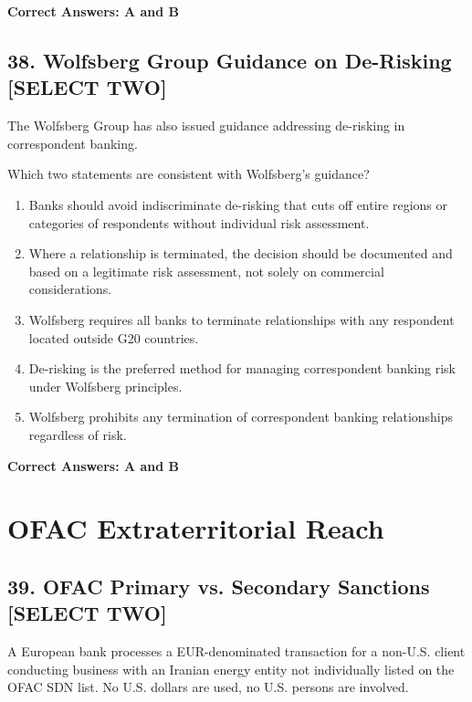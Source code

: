 \documentclass[11pt,a4paper]{article}
\begin{document}
	\textbf{Correct Answers: A and B}
	
	\subsection{38. Wolfsberg Group Guidance on De-Risking \textnormal{[SELECT TWO]}}
	
	The Wolfsberg Group has also issued guidance addressing de-risking in correspondent banking.
	
	Which two statements are consistent with Wolfsberg's guidance?
	
	\begin{enumerate}[label=\Alph*.]
		\item Banks should avoid indiscriminate de-risking that cuts off entire regions or categories of respondents without individual risk assessment.
		\item Where a relationship is terminated, the decision should be documented and based on a legitimate risk assessment, not solely on commercial considerations.
		\item Wolfsberg requires all banks to terminate relationships with any respondent located outside G20 countries.
		\item De-risking is the preferred method for managing correspondent banking risk under Wolfsberg principles.
		\item Wolfsberg prohibits any termination of correspondent banking relationships regardless of risk.
	\end{enumerate}
	
	\textbf{Correct Answers: A and B}
	
	\section{OFAC Extraterritorial Reach}
	
	\subsection{39. OFAC Primary vs. Secondary Sanctions \textnormal{[SELECT TWO]}}
	
	A European bank processes a EUR-denominated transaction for a non-U.S. client conducting business with an Iranian energy entity not individually listed on the OFAC SDN list. No U.S. dollars are used, no U.S. persons are involved.
	
\end{document}
